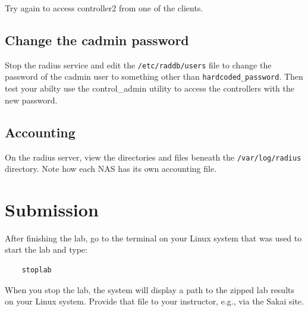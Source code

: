 Try again to access controller2 from one of the clients.

\subsection{Change the cadmin password}
Stop the radius service and edit the {\tt /etc/raddb/users} file to change the 
password of the cadmin user to something other than {\tt hardcoded\_password}.  Then test your abilty
use the control\_admin  utility to access the controllers with the new password.

\subsection{Accounting}
On the radius server, view the directories and files beneath the {\tt /var/log/radius} directory.
Note how each NAS has its own accounting file.  

\section{Submission}
After finishing the lab, go to the terminal on your Linux system that was used to start the lab and type:
\begin{verbatim}
    stoplab 
\end{verbatim}
When you stop the lab, the system will display a path to the zipped lab results on your Linux system.  Provide that file to 
your instructor, e.g., via the Sakai site.


